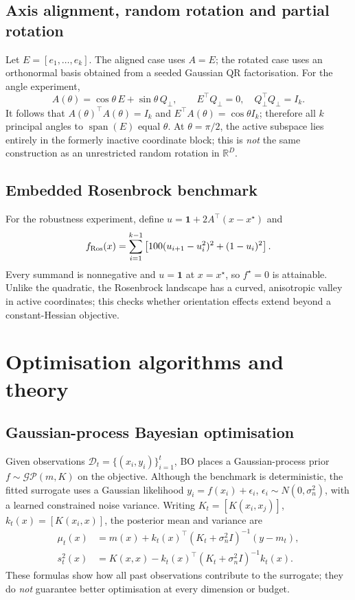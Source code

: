 \documentclass[11pt,a4paper]{article}
\newcommand{\R}{\mathbb{R}}
\begin{document}
\subsection{Axis alignment, random rotation and partial rotation}
Let $E=[e_1,\ldots,e_k]$. The aligned case uses $A=E$; the rotated case uses an orthonormal basis obtained from a seeded Gaussian QR factorisation. For the angle experiment,
\begin{equation}A(\theta)=\cos\theta\,E+\sin\theta\,Q_\perp,\qquad E^\top Q_\perp=0,\quad Q_\perp^\top Q_\perp=I_k.\end{equation}
It follows that $A(\theta)^\top A(\theta)=I_k$ and $E^\top A(\theta)=\cos\theta I_k$; therefore all $k$ principal angles to $\operatorname{span}(E)$ equal $\theta$. At $\theta=\pi/2$, the active subspace lies entirely in the formerly inactive coordinate block; this is \emph{not} the same construction as an unrestricted random rotation in $\R^D$.

\subsection{Embedded Rosenbrock benchmark}
For the robustness experiment, define $u=\mathbf 1+2A^\top(x-x^\star)$ and
\begin{equation}f_{\rm Ros}(x)=\sum_{i=1}^{k-1}\left[100(u_{i+1}-u_i^2)^2+(1-u_i)^2\right].\end{equation}
Every summand is nonnegative and $u=\mathbf 1$ at $x=x^\star$, so $f^\star=0$ is attainable. Unlike the quadratic, the Rosenbrock landscape has a curved, anisotropic valley in active coordinates; this checks whether orientation effects extend beyond a constant-Hessian objective.

\section{Optimisation algorithms and theory}
\subsection{Gaussian-process Bayesian optimisation}
Given observations $\mathcal D_t=\{(x_i,y_i)\}_{i=1}^t$, BO places a Gaussian-process prior $f\sim\mathcal{GP}(m,K)$ on the objective. Although the benchmark is deterministic, the fitted surrogate uses a Gaussian likelihood $y_i=f(x_i)+\epsilon_i$, $\epsilon_i\sim N(0,\sigma_n^2)$, with a learned constrained noise variance. Writing $K_t=[K(x_i,x_j)]$, $k_t(x)=[K(x_i,x)]$, the posterior mean and variance are
\begin{align}
\mu_t(x)&=m(x)+k_t(x)^\top(K_t+\sigma_n^2I)^{-1}(y-m_t),\\
s_t^2(x)&=K(x,x)-k_t(x)^\top(K_t+\sigma_n^2I)^{-1}k_t(x).
\end{align}
These formulas show how all past observations contribute to the surrogate; they do \emph{not} guarantee better optimisation at every dimension or budget.
\end{document}
